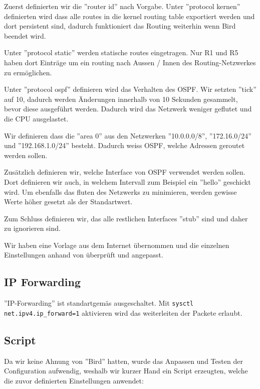 \documentclass[11pt,titlepage]{article}
\begin{document}
Zuerst definierten wir die ''router id'' nach Vorgabe.
\medskip
Unter ''protocol kernen'' definierten wird dass alle routes in die kernel routing table exportiert werden und dort persistent sind, dadurch funktioniert das Routing weiterhin wenn Bird beendet wird.

\medskip
Unter ''protocol static'' werden statische routes eingetragen. Nur R1 und R5 haben dort Einträge um ein routing nach Aussen / Innen des Routing-Netzwerkes zu ermöglichen.

\medskip
Unter ''protocol ospf'' definieren wird das Verhalten des OSPF. Wir setzten ''tick'' auf 10, dadurch werden Änderungen innerhalb von 10 Sekunden gesammelt, bevor diese ausgeführt werden. Dadurch wird das Netzwerk weniger geflutet und die CPU ausgelastet.

Wir definieren dass die ''area 0'' aus den Netzwerken ''10.0.0.0/8'', ''172.16.0/24'' und ''192.168.1.0/24'' besteht. Dadurch weiss OSPF, welche Adressen geroutet werden sollen.

Zusätzlich definieren wir, welche Interface von OSPF verwendet werden sollen. Dort definieren wir auch, in welchem Intervall zum Beispiel ein ''hello'' geschickt wird.
Um ebenfalls das fluten des Netzwerks zu minimieren, werden gewisse Werte höher gesetzt als der Standartwert.

Zum Schluss definieren wir, das alle restlichen Interfaces ''stub'' sind und daher zu ignorieren sind.

\medskip
Wir haben eine Vorlage aus dem Internet übernommen \cite{BIRD_EXAMPLE} und die einzelnen Einstellungen anhand von \cite{BIRD_DOC} überprüft und angepasst.

\subsection{IP Forwarding}
\label{subsec:IPForwarding}

''IP-Forwarding'' ist standartgemäs ausgeschaltet. Mit \lstinline{sysctl net.ipv4.ip_forward=1} aktivieren wird das weiterleiten der Packete erlaubt.

\par\medskip

\subsection{Script}
\label{subsec:Script}

Da wir keine Ahnung von ''Bird'' hatten, wurde das Anpassen und Testen der Configuration aufwendig, weshalb wir kurzer Hand ein Script erzeugten, welche die zuvor definierten Einstellungen anwendet:
\end{document}
